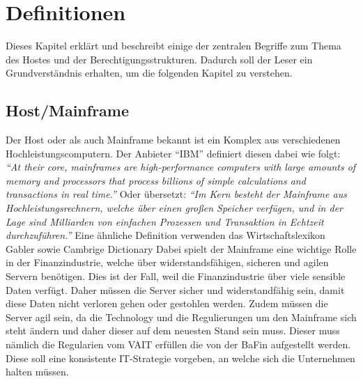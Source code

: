 \chapter{Definitionen}
\label{ch:chapter02}
Dieses Kapitel erklärt und beschreibt einige der zentralen Begriffe zum Thema des Hostes und der Berechtigungsstrukturen.
Dadurch soll der Leser ein Grundverständnis erhalten, um die folgenden Kapitel zu verstehen.

%
%

\section{Host/Mainframe}
\label{sec:Host}
Der Host oder als auch Mainframe bekannt ist ein Komplex aus verschiedenen Hochleistungscomputern.
Der Anbieter "`IBM"' definiert diesen dabei wie folgt: 
\newline
\newline
\textit{"`At their core, mainframes are high-performance computers with large amounts of memory and processors that process billions of simple calculations and transactions in real time."'} \cite{Mainframe}
\newline
\newline
Oder übersetzt:
\newline
\newline
\textit{"`Im Kern besteht der Mainframe aus Hochleistungsrechnern, welche über einen großen Speicher verfügen, und in der Lage sind Milliarden von einfachen Prozessen und Transaktion in Echtzeit durchzuführen."'} \cite{Mainframe}
\newline
\newline
Eine ähnliche Definition verwenden das Wirtschaftslexikon Gabler \cite{Main} sowie Cambrige Dictionary \cite{CambMain}
Dabei spielt der Mainframe eine wichtige Rolle in der Finanzindustrie, welche über widerstandsfähigen, sicheren und agilen Servern benötigen.
Dies ist der Fall, weil die Finanzindustrie über viele sensible Daten verfügt.
Daher müssen die Server sicher und widerstandfähig sein, damit diese Daten nicht verloren gehen oder gestohlen werden.
Zudem müssen die Server agil sein, da die Technology und die Regulierungen um den Mainframe sich steht ändern und daher dieser auf dem neuesten Stand sein muss.
Dieser muss nämlich die Regularien vom \ac{VAIT} erfüllen die von der \ac{BaFin} aufgestellt werden.
Diese soll eine konsistente IT-Strategie vorgeben, an welche sich die Unternehmen halten müssen. \cite{Vait}

